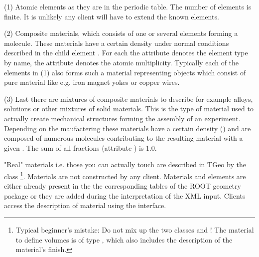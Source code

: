 \documentclass[10pt,a4paper]{article}
\begin{document}
\begin{description}
\item{(1)} Atomic elements as they are in the periodic table. The number of elements
    is finite. It is unlikely any client will have to extend the known elements.
\item{(2)} Composite materials, which consists of one or several elements 
    forming a molecule. These materials have a certain density under normal 
    conditions described in the child element .
    For each  the attribute  denotes the element type by name, 
    the attribute  denotes the atomic multiplicity. 
    Typically each of the elements in (1) also forms such a material representing 
    objects which consist of pure material like e.g. iron magnet yokes or copper wires.
\item{(3)} Last there are mixtures of composite materials to describe 
    for example alloys, solutions or other mixtures of solid materials. 
    This is the type of material used to actually create mechanical structures
    forming the assembly of an experiment. Depending on the maufactering
    these materials have a certain density () and are composed 
    of numerous molecules contributing to the resulting material with a given 
    . The sum of all fractions (attribute ) is 1.0.
\end{description}
"Real" materials i.e. those you can actually touch are described in TGeo
by the class 
\footnote{Typical beginner's mistake: Do not mix up the 
two classes  and !
The material to define volumes is of type , which also includes the 
description of the material's finish.}.
Materials are not constructed by any client. Materials and elements are 
either already present in the the corresponding tables of the ROOT geometry
package or they are added during the interpretation of the XML input.
Clients access the description of material using the  interface.
\end{document}
